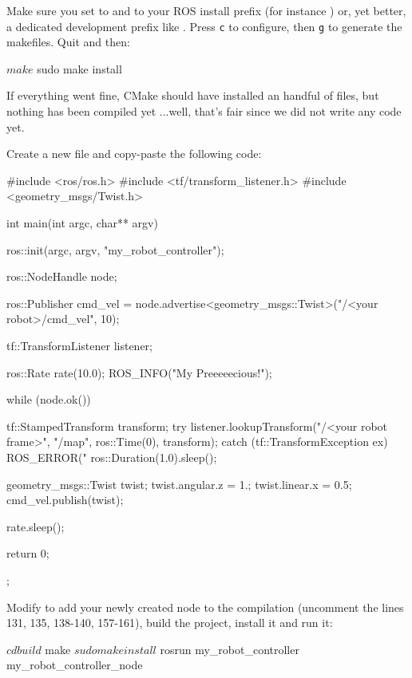 \documentclass{instructions}
\begin{document}
Make sure you set  to  and
 to your ROS install prefix (for instance
) or, yet better, a dedicated development prefix like
. Press {\tt c} to configure, then {\tt g} to generate
the makefiles. Quit  and then:

\begin{shcode}
$ make
$ sudo make install
\end{shcode}

If everything went fine, CMake should have installed an handful of files, but
nothing has been compiled yet ...well, that's fair since we did not write any
code yet.

Create a new file  and copy-paste the
following code:

\begin{cppcode}
#include <ros/ros.h>
#include <tf/transform_listener.h>
#include <geometry_msgs/Twist.h>

int main(int argc, char** argv){
  ros::init(argc, argv, "my_robot_controller");

  ros::NodeHandle node;

  ros::Publisher cmd_vel = node.advertise<geometry_msgs::Twist>("/<your robot>/cmd_vel", 10);

  tf::TransformListener listener;

  ros::Rate rate(10.0);
  ROS_INFO("My Preeeeecious!");

  while (node.ok()){
    tf::StampedTransform transform;
    try{
      listener.lookupTransform("/<your robot frame>", "/map",  
                               ros::Time(0), transform);
    }
    catch (tf::TransformException ex){
      ROS_ERROR("%
      ros::Duration(1.0).sleep();
    }

    geometry_msgs::Twist twist;
    twist.angular.z = 1.;
    twist.linear.x = 0.5;
    cmd_vel.publish(twist);

    rate.sleep();
  }
  return 0;
};
\end{cppcode}

Modify  to add your newly created node to the compilation (uncomment
the lines 131, 135, 138-140, 157-161), build the project, install it and run it:

\begin{shcode}
$ cd build
$ make
$ sudo make install
$ rosrun my_robot_controller my_robot_controller_node
\end{shcode}
\end{document}
